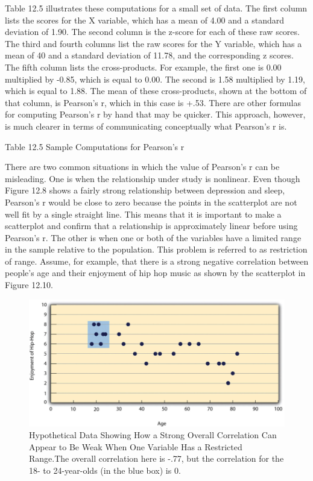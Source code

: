 Table 12.5 illustrates these computations for a small set of data. The first column lists the scores for the X variable, which has a mean of 4.00 and a standard deviation of 1.90. The second column is the z-score for each of these raw scores. The third and fourth columns list the raw scores for the Y variable, which has a mean of 40 and a standard deviation of 11.78, and the corresponding z scores. The fifth column lists the cross-products. For example, the first one is 0.00 multiplied by -0.85, which is equal to 0.00. The second is 1.58 multiplied by 1.19, which is equal to 1.88. The mean of these cross-products, shown at the bottom of that column, is Pearson's r, which in this case is +.53. There are other formulas for computing Pearson's r by hand that may be quicker. This approach, however, is much clearer in terms of communicating conceptually what Pearson's r is.

Table 12.5 Sample Computations for Pearson's r

There are two common situations in which the value of Pearson's r can be misleading. One is when the relationship under study is nonlinear. Even though Figure 12.8 shows a fairly strong relationship between depression and sleep, Pearson's r would be close to zero because the points in the scatterplot are not well fit by a single straight line. This means that it is important to make a scatterplot and confirm that a relationship is approximately linear before using Pearson's r. The other is when one or both of the variables have a limited range in the sample relative to the population. This problem is referred to as restriction of range. Assume, for example, that there is a strong negative correlation between people's age and their enjoyment of hip hop music as shown by the scatterplot in Figure 12.10.

\begin{figure}
\includegraphics[width=\linewidth]{figures/Fig12-10}
\caption{Hypothetical Data Showing How a Strong Overall Correlation Can Appear to Be Weak When One Variable Has a Restricted Range.The overall correlation here is -.77, but the correlation for the 18- to 24-year-olds (in the blue box) is 0.}
\label{fig:restricted}
\end{figure}

